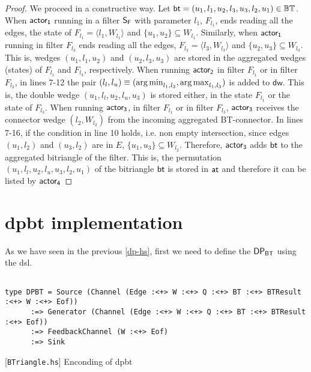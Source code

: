 \begin{proof}
We proceed in a constructive way. Let $\mathsf{bt} = (u_1,l_1,u_2,l_3,u_3,l_2,u_1) \in \mathbb{BT}$. 
When $\mathsf{actor_1}$ running in a filter $\mathsf{S_F}$ with parameter $l_1$, $F_{l_1}$, ends reading all the edges, the state of $F_{l_1} = \langle l_1,  W_{l_1}\rangle$ and  $\{u_1,u_2\} \subseteq W_{l_1}$. Similarly,  when $\mathsf{actor_1}$ running in filter $F_{l_3}$ ends reading all the edges,  $F_{l_3} = \langle l_3,  W_{l_3}\rangle$ and $\{u_2,u_3\} \subseteq W_{l_3}$. This is, wedges $(u_1,l_1,u_2)$ and $(u_2,l_3,u_3)$ are stored in the aggregated wedges (states) of $F_{l_1}$ and $F_{l_3}$, respectively. 
When running  $\mathsf{actor_2}$ in filter $F_{l_1}$ or in filter $F_{l_3}$, in lines 7-12 the pair 
$(l_l, l_u) \equiv (\operatorname*{arg\,min}_{l_1,l_3}, \operatorname*{arg\,max}_{l_1,l_3})$ is added to $\mathsf{dw}$. This is, the double wedge $(u_1,l_l,u_2,l_u,u_3)$ is stored either, in the state $F_{l_1}$ or the state of $F_{l_3}$. When running $\mathsf{actor_3}$, in filter $F_{l_1}$ or in filter $F_{l_3}$, $\mathsf{actor_3}$ receives the connector wedge $(l_2, W_{l_2})$ from the incoming  aggregated BT-connector. In lines 7-16, if the condition in line 10 holds, i.e. non empty intersection, since edges $(u_1,l_2)$ and $(u_3,l_2)$ are in $E$, $\{u_1,u_3\} \subseteq W_{l_2}$. Therefore, $\mathsf{actor_3}$ adds  $\mathsf{bt}$  to the aggregated bitriangle of the filter. This is, the permutation  $(u_1,l_l,u_2,l_u,u_3,l_2,u_1)$ of the bitriangle $\mathsf{bt}$ is stored in $\mathsf{at}$ and therefore it can be listed by $\mathsf{actor_4}$
\end{proof}        
 
\section{\acrshort{dpbt} implementation}\label{sec:iebt:hs:imp}
As we have seen in the previous \autoref{dp-hs}, first we need to define the $\mathsf{DP_{BT}}$ using the \acrshort{dsl}.

\begin{listing}[htp!]
\begin{verbatim}

type DPBT = Source (Channel (Edge :<+> W :<+> Q :<+> BT :<+> BTResult :<+> W :<+> Eof))
      :=> Generator (Channel (Edge :<+> W :<+> Q :<+> BT :<+> BTResult :<+> Eof))
      :=> FeedbackChannel (W :<+> Eof)
      :=> Sink

\end{verbatim}
\caption{[\texttt{BTriangle.hs}] Enconding of \acrshort{dpbt}}
\label{src:dpbt:1}
\end{listing}

